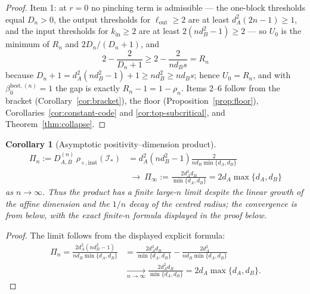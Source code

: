 \documentclass[11pt,a4paper]{article}
\newtheorem{corollary}[theorem]{Corollary}
\begin{document}
\begin{proof}
Item 1: at $r=0$ no pinching term is admissible --- the one-block thresholds equal $D_n>0$, the output thresholds for $\ell_{\mathrm{out}}\ge2$ are at least $d_A^2(2n-1)\ge1$, and the input thresholds for $k_{\mathrm{in}}\ge2$ are at least $2(nd_B^2-1)\ge2$ --- so $U_0$ is the minimum of $R_n$ and $2D_n/(D_n+1)$, and
\[
2-\frac{2}{D_n+1}\ge 2-\frac{2}{nd_Bs}=R_n
\]
because $D_n+1=d_A^2(nd_B^2-1)+1\ge nd_B^2\ge nd_Bs$; hence $U_0=R_n$, and with $\beta_0^{\mathrm{best},(n)}=1$ the gap is exactly $R_n-1=1-\rho_n$. Items 2--6 follow from the bracket (Corollary~\ref{cor:bracket}), the floor (Proposition~\ref{prop:floor}), Corollaries~\ref{cor:constant-code} and \ref{cor:top-subcritical}, and Theorem~\ref{thm:collapse}.
\end{proof}

\begin{corollary}[Asymptotic positivity--dimension product]
\label{cor:asymptotic}
\begin{align*}
\Pi_n:=D_{A,B}^{(n)}\,\rho_{\diamond,\mathrm{inst}}(\mathcal I_*)
&=d_A^2(nd_B^2-1)\frac{2}{nd_B\min\{d_A,d_B\}}\\
&\ \longrightarrow\ 
\Pi_\infty:=\frac{2d_A^2d_B}{\min\{d_A,d_B\}}
=2d_A\max\{d_A,d_B\}
\end{align*}
as $n\to\infty$. Thus the product has a finite large-$n$ limit despite the linear growth of the affine dimension and the $1/n$ decay of the centred radius; the convergence is from below, with the exact finite-$n$ formula displayed in the proof below.
\end{corollary}

\begin{proof}
The limit follows from the displayed explicit formula:
\begin{align*}
\Pi_n=\frac{2d_A^2(nd_B^2-1)}{nd_B\min\{d_A,d_B\}}
&=\frac{2d_A^2d_B}{\min\{d_A,d_B\}}-\frac{2d_A^2}{nd_B\min\{d_A,d_B\}}\\
&\xrightarrow[n\to\infty]{}\frac{2d_A^2d_B}{\min\{d_A,d_B\}}
=2d_A\max\{d_A,d_B\}.
\end{align*}
\end{proof}
\end{document}

